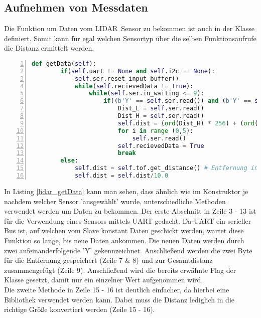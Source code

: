 \subsection{Aufnehmen von Messdaten}
Die Funktion um Daten vom \ac{LIDAR} Sensor zu bekommen ist auch in der Klasse definiert. Somit kann für egal welchen Sensortyp über die selben Funktionsaufrufe die Distanz ermittelt werden. 
\begin{lstlisting}[caption={Funktion um Distanz vom \ac{LIDAR} Sensor zu erhalten}, language={Python}, label={lidar_getData}, numbers=left]
	def getData(self):
        if(self.uart != None and self.i2c == None):
            self.ser.reset_input_buffer()
            while(self.recievedData != True):
                while(self.ser.in_waiting <= 9):
                    if((b'Y' == self.ser.read()) and (b'Y' == self.ser.read())):
                        Dist_L = self.ser.read()
                        Dist_H = self.ser.read()
                        self.dist = (ord(Dist_H) * 256) + (ord(Dist_L))
                        for i in range (0,5):
                            self.ser.read()
                        self.recievedData = True
                        break
        else:
            self.dist = self.tof.get_distance() # Entfernung in mm
            self.dist = self.dist/10.0
\end{lstlisting}
In Listing \ref{lidar_getData} kann man sehen, dass ähnlich wie im Konstruktor je nachdem welcher Sensor 'ausgewählt' wurde, unterschiedliche Methoden verwendet werden um Daten zu bekommen. Der erste Abschnitt in Zeile 3 - 13 ist für die Verwendung eines Sensors mittels \ac{UART} gedacht. Da \ac{UART} ein serieller Bus ist, auf welchen vom Slave konstant Daten geschickt werden, wartet diese Funktion so lange, bis neue Daten ankommen. Die neuen Daten werden durch zwei aufeinanderfolgende 'Y' gekennzeichnet. Anschließend werden die zwei Byte für die Entfernung gespeichert (Zeile 7 \& 8) und zur Gesamtdistanz zusammengefügt (Zeile 9). Anschließend wird die bereits erwähnte Flag der Klasse gesetzt, damit nur ein einzelner Wert aufgenommen wird.\\
Die zweite Methode in Zeile 15 - 16 ist deutlich einfacher, da hierbei eine Bibliothek verwendet werden kann. Dabei muss die Distanz lediglich in die richtige Größe konvertiert werden (Zeile 15 - 16).
